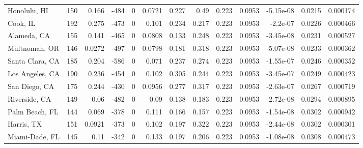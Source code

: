 \documentclass[12pt,letterpaper]{article}
\begin{document}
\begin{sidewaystable}
{\begin{tabular}{lrrrrrrrrrrrr}
 Honolulu, HI       & 150   & 0.166   & -484   &     0 &          0.0721 &            0.227 &         0.49   &        0.223 &       0.0953 &        -5.15e-08 &           0.0215  &        0.000174 \\
 Cook, IL           & 192   & 0.275   & -473   &     0 &          0.101  &            0.234 &         0.217  &        0.223 &       0.0953 &        -2.2e-07  &           0.0226  &        0.000466 \\
 Alameda, CA        & 155   & 0.141   & -465   &     0 &          0.0808 &            0.133 &         0.248  &        0.223 &       0.0953 &        -3.45e-08 &           0.0231  &        0.000527 \\
 Multnomah, OR      & 146   & 0.0272  & -497   &     0 &          0.0798 &            0.181 &         0.318  &        0.223 &       0.0953 &        -5.07e-08 &           0.0233  &        0.000362 \\
 Santa Clara, CA    & 185   & 0.204   & -586   &     0 &          0.071  &            0.237 &         0.274  &        0.223 &       0.0953 &        -1.55e-07 &           0.0246  &        0.000352 \\
 Los Angeles, CA    & 190   & 0.236   & -454   &     0 &          0.102  &            0.305 &         0.244  &        0.223 &       0.0953 &        -3.45e-07 &           0.0249  &        0.000423 \\
 San Diego, CA      & 175   & 0.244   & -430   &     0 &          0.0956 &            0.277 &         0.317  &        0.223 &       0.0953 &        -2.63e-07 &           0.0267  &        0.000719 \\
 Riverside, CA      & 149   & 0.06    & -482   &     0 &          0.09   &            0.138 &         0.183  &        0.223 &       0.0953 &        -2.72e-08 &           0.0294  &        0.000895 \\
 Palm Beach, FL     & 144   & 0.069   & -378   &     0 &          0.111  &            0.166 &         0.157  &        0.223 &       0.0953 &        -1.54e-08 &           0.0302  &        0.000942 \\
 Harris, TX         & 151   & 0.0921  & -373   &     0 &          0.102  &            0.197 &         0.322  &        0.223 &       0.0953 &        -2.44e-08 &           0.0302  &        0.000301 \\
 Miami-Dade, FL     & 145   & 0.11    & -342   &     0 &          0.133  &            0.197 &         0.206  &        0.223 &       0.0953 &        -1.08e-08 &           0.0308  &        0.000473 \\

\end{tabular}}
\end{sidewaystable}
\end{document}
